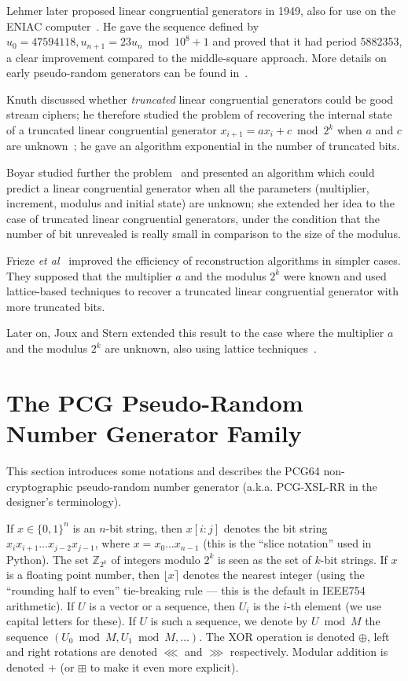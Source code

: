 \documentclass[journal=tosc,final]{iacrtrans}
\begin{document}
Lehmer later proposed linear congruential generators in 1949, also for use on
the ENIAC computer~\cite{Lehmer}. He gave the sequence defined by
$u_0 = 47594118, u_{n+1} = 23 u_n \bmod 10^8 + 1$ and proved that it had period
5882353, a clear improvement compared to the middle-square approach. More
details on early pseudo-random generators can be found in~\cite{Knuth}.

Knuth discussed whether \emph{truncated} linear congruential generators could be
good stream ciphers; he therefore studied the problem of recovering the internal
state of a truncated linear congruential generator
$x_{i+1} = ax_i + c \bmod 2^k$ when $a$ and $c$ are unknown~\cite{Knuth85}; he
gave an algorithm exponential in the number of truncated bits.

Boyar studied further the problem~\cite{Boyar1989} and presented an algorithm
which could predict a linear congruential generator when all the parameters
(multiplier, increment, modulus and initial state) are unknown; she extended her
idea to the case of truncated linear congruential generators, under the
condition that the number of bit unrevealed is really small in comparison to the
size of the modulus.

Frieze \textit{et al}~\cite{Frieze} improved the efficiency of reconstruction
algorithms in simpler cases. They supposed that the multiplier $a$ and the
modulus $2^k$ were known and used lattice-based techniques to recover a
truncated linear congruential generator with more truncated bits.

Later on, Joux and Stern extended this result to the case where the multiplier
$a$ and the modulus $2^k$ are unknown, also using lattice
techniques~\cite{JouxS98}.

\section{The PCG Pseudo-Random Number Generator Family}

This section introduces some notations and describes the \textsf{PCG64}
non-cryptographic pseudo-random number generator (a.k.a. \textsf{PCG-XSL-RR} in
the designer's terminology).

If $x \in \{0, 1\}^n$ is an $n$-bit string, then $x[i:j]$ denotes the bit string
$x_ix_{i+1}\dots x_{j-2}x_{j-1}$, where $x = x_0\dots x_{n-1}$ (this is the
``slice notation'' used in \textsf{Python}). The set $\mathbb{Z}_{2^k}$ of
integers modulo $2^k$ is seen as the set of $k$-bit strings. If $x$ is a
floating point number, then $\lfloor x \rceil$ denotes the nearest integer
(using the ``rounding half to even'' tie-breaking rule --- this is the default
in IEEE754 arithmetic). If $U$ is a vector or a sequence, then $U_i$ is the
$i$-th element (we use capital letters for these). If $U$ is such a sequence, we
denote by $U \bmod M$ the sequence $(U_0 \bmod M, U_1 \bmod M, \dots)$. The XOR
operation is denoted $\oplus$, left and right rotations are denoted $\lll$ and
$\ggg$ respectively. Modular addition is denoted $+$ (or $\boxplus$ to make it
even more explicit).
\end{document}
